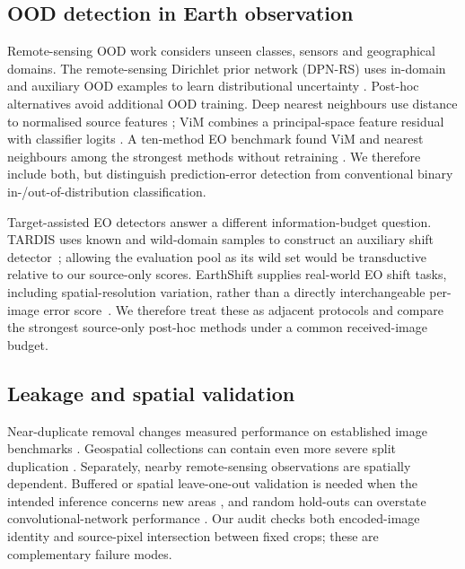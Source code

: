 \subsection{OOD detection in Earth observation}

Remote-sensing OOD work considers unseen classes, sensors and geographical
domains. The remote-sensing Dirichlet prior network (DPN-RS) uses in-domain and
auxiliary OOD examples to learn distributional uncertainty
\citep{gawlikowski2022dpnrs}. Post-hoc alternatives
avoid additional OOD training. Deep nearest neighbours use distance to
normalised source features \citep{sun2022knn}; ViM combines a principal-space
feature residual with classifier logits \citep{wang2022vim}. A ten-method EO
benchmark found ViM and nearest neighbours among the strongest methods without
retraining \citep{li2024tenood}. We therefore include both, but distinguish
prediction-error detection from conventional binary in-/out-of-distribution
classification.

Target-assisted EO detectors answer a different information-budget question.
TARDIS uses known and wild-domain samples to construct an auxiliary shift
detector~\citep{ekim2025tardis}; allowing the evaluation pool as its wild set
would be transductive relative to our source-only scores. EarthShift supplies
real-world EO shift tasks, including spatial-resolution variation, rather than
a directly interchangeable per-image error score~\citep{doerksen2026earthshift}.
We therefore treat these as adjacent protocols and compare the strongest
source-only post-hoc methods under a common received-image budget.

\subsection{Leakage and spatial validation}

Near-duplicate removal changes measured performance on established image
benchmarks \citep{barz2020cifair}. Geospatial collections can contain even more
severe split duplication \citep{geospatialdedup2023}. Separately, nearby
remote-sensing observations are spatially dependent. Buffered or spatial
leave-one-out validation is needed when the intended inference concerns new
areas \citep{karasiak2022spatial}, and random hold-outs can overstate
convolutional-network performance \citep{kattenborn2022spatial}. Our audit
checks both encoded-image identity and source-pixel intersection between fixed
crops; these are complementary failure modes.
